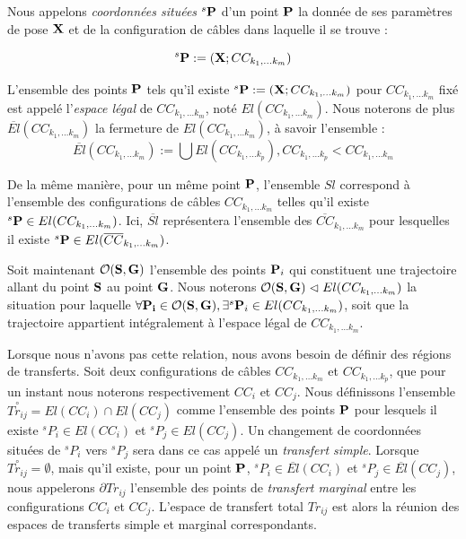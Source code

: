 Nous appelons {\it coordonn\'ees situ\'ees} ${}^s{\bf P}$ d'un point
${\bf P}$ la donn\'ee de ses param\`etres de pose ${\bf X}$ et de la
configuration de c\^ables dans laquelle il se trouve :

$${}^s{\bf P} := ({\bf X} ; CC_{k_1, \dots k_m})$$

L'ensemble des points $\bf P$ tels qu'il existe ${}^s {\bf P} :=
({\bf X} ; CC_{k_1, \dots k_m})$ pour $CC_{k_1, \dots k_m}$ fix\'e est appel\'e
l'{\it espace l\'egal} de $CC_{k_1, \dots k_m}$, not\'e $El(CC_{k_1, \dots
k_m})$. Nous noterons de plus $\overline{El}(CC_{k_1, \dots
k_m})$ la fermeture de ${El}(CC_{k_1, \dots k_m})$, \`a savoir l'ensemble :
$$\overline{El}(CC_{k_1, \dots k_m}) := \bigcup
El(CC_{k_1, \dots k_p}), CC_{k_1, \dots k_p} < CC_{k_1, \dots k_m}$$

De la m\^eme mani\`ere, pour un m\^eme point $\bf P$, l'ensemble $Sl$
correspond \`a l'ensemble des configurations de c\^ables $CC_{k_1, \dots k_m}$
telles qu'il existe ${}^s{\bf P} \in El(CC_{k_1, \dots k_m})$. Ici,
$\overline{Sl}$ repr\'esentera l'ensemble des $\overline{CC}_{k_1, \dots k_m}$
pour lesquelles il existe ${}^s{\bf P} \in El(\overline{CC}_{k_1, \dots k_m})$.

Soit maintenant $\mathcal O({\bf S}, {\bf G})$ l'ensemble des points ${\bf
P}_i$ qui constituent une trajectoire allant du point ${\bf S}$ au point ${\bf
G}$. Nous noterons $\mathcal O({\bf S}, {\bf G}) \vartriangleleft
El(CC_{k_1, \dots k_m})$ la situation pour laquelle $\forall {\bf P_i} \in
\mathcal O({\bf S}, {\bf G}), \exists {}^s{\bf P}_i \in El(CC_{k_1, \dots
k_m})$, soit que la trajectoire appartient int\'egralement \`a l'espace l\'egal
de $CC_{k_1, \dots k_m}$.

Lorsque nous n'avons pas cette relation, nous avons besoin de d\'efinir des
r\'egions de transferts. Soit deux configurations de c\^ables
$CC_{k_1, \dots k_m}$ et $CC_{k_1, \dots k_p}$, que pour un instant nous
noterons respectivement $CC_i$ et $CC_j$. Nous d\'efinissons l'ensemble
$\overset{\circ}{Tr_{ij}} = El(CC_i) \cap El(CC_j)$ comme l'ensemble des points
${\bf P}$ pour lesquels il existe ${}^sP_i \in El(CC_i)$ et ${}^sP_j \in
El(CC_j)$. Un changement de coordonn\'ees situ\'ees de ${}^sP_i$ vers ${}^sP_j$
sera dans ce cas appel\'e un {\it transfert simple}. Lorsque
$\overset{\circ}{Tr_{ij}} = \emptyset$, mais qu'il existe, pour un point ${\bf
P}$, ${}^sP_i \in \overline{El}(CC_i)$ et ${}^sP_j \in \overline{El}(CC_j)$, nous
appelerons $\partial Tr_{ij}$ l'ensemble des points de {\it transfert marginal}
entre les configurations $CC_i$ et $CC_j$. L'espace de transfert total $Tr_{ij}$
est alors la r\'eunion des espaces de transferts simple et marginal
correspondants.

